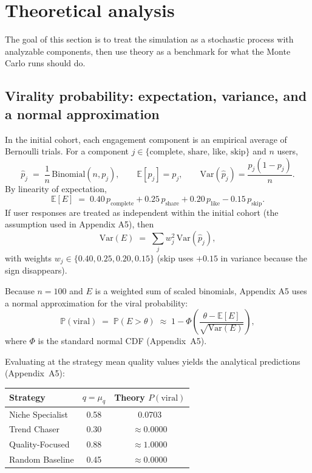 \documentclass[10pt]{article}
\newcommand{\appref}[1]{(Appendix~#1)}
\begin{document}
\section{Theoretical analysis}
The goal of this section is to treat the simulation as a stochastic process with analyzable components, then use theory as a benchmark for what the Monte Carlo runs should do.

\subsection{Virality probability: expectation, variance, and a normal approximation}
In the initial cohort, each engagement component is an empirical average of Bernoulli trials. For a component \(j\in\{\text{complete, share, like, skip}\}\) and \(n\) users,
\[
\widehat{p}_j \;=\; \frac{1}{n}\,\text{Binomial}(n,p_j),\qquad
\mathbb{E}[\widehat{p}_j]=p_j,\qquad
\mathrm{Var}(\widehat{p}_j)=\frac{p_j(1-p_j)}{n}.
\]
By linearity of expectation,
\[
\mathbb{E}[E] \;=\; 0.40\,p_{\text{complete}} + 0.25\,p_{\text{share}} + 0.20\,p_{\text{like}} - 0.15\,p_{\text{skip}}.
\]
If user responses are treated as independent within the initial cohort (the assumption used in Appendix A5), then
\[
\mathrm{Var}(E)\;=\;\sum_{j} w_j^2\,\mathrm{Var}(\widehat{p}_j),
\]
with weights \(w_j\in\{0.40,0.25,0.20,0.15\}\) (skip uses \(+0.15\) in variance because the sign disappears).

Because \(n=100\) and \(E\) is a weighted sum of scaled binomials, Appendix A5 uses a normal approximation for the viral probability:
\[
\mathbb{P}(\text{viral}) \;=\; \mathbb{P}(E>\theta) \;\approx\; 1-\Phi\!\left(\frac{\theta-\mathbb{E}[E]}{\sqrt{\mathrm{Var}(E)}}\right),
\]
where \(\Phi\) is the standard normal CDF \appref{A5}.

Evaluating at the strategy mean quality values yields the analytical predictions \appref{A5}:
\begin{center}
\small
\begin{tabular}{lcc}
\toprule
Strategy & \(q=\mu_q\) & Theory \(P(\text{viral})\) \\
\midrule
Niche Specialist & 0.58 & 0.0703 \\
Trend Chaser & 0.30 & \(\approx 0.0000\) \\
Quality-Focused & 0.88 & \(\approx 1.0000\) \\
Random Baseline & 0.45 & \(\approx 0.0000\) \\
\bottomrule
\end{tabular}
\end{center}
\end{document}
